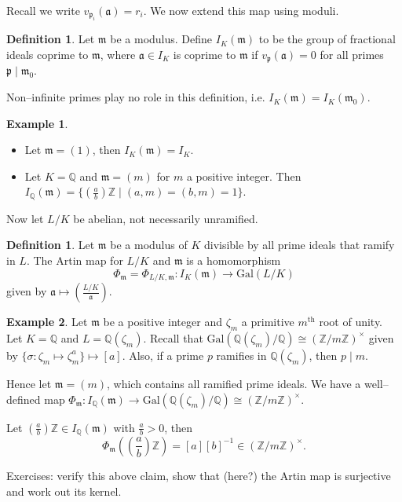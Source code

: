 \documentclass{article}
\theoremstyle{definition}
\newtheorem{example}{Example}[section]
\newtheorem{defn}[theorem]{Definition}
\begin{document}

Recall we write $v_{\mathfrak{p}_i}(\mathfrak{a}) = r_i$. We now extend this map using moduli.

\begin{defn}
    Let $\mathfrak{m}$ be a modulus. Define $I_K(\mathfrak{m})$ to be the group of fractional ideals coprime to $\mathfrak{m}$, where $\mathfrak{a} \in I_K$ is coprime to $\mathfrak{m}$ if $v_{\mathfrak{p}}(\mathfrak{a})=0$ for all primes $\mathfrak{p} \mid \mathfrak{m}_0$.
\end{defn}
Non--infinite primes play no role in this definition, i.e. $I_K(\mathfrak{m}) = I_K(\mathfrak{m}_0)$. 
\begin{example}
    \begin{itemize}
        \item Let $\mathfrak{m} = (1)$, then $I_K(\mathfrak{m}) = I_K$.
        \item Let $K = \mathbb{Q}$ and $\mathfrak{m} = (m)$ for $m$ a positive integer. Then $I_{\mathbb{Q}}(\mathfrak{m}) = \{\left(\frac{a}{b}\right)\mathbb{Z} \mid (a,m)=(b,m)=1\}$.
    \end{itemize}
\end{example}
Now let $L/K$ be abelian, not necessarily unramified.
\begin{defn}
    Let $\mathfrak{m}$ be a modulus of $K$ divisible by all prime ideals that ramify in $L$. The Artin map for $L/K$ and $\mathfrak{m}$ is a homomorphism \[
    \Phi_{\mathfrak{m}} = \Phi_{L/K, \mathfrak{m}} : I_K(\mathfrak{m}) \to \text{Gal}(L/K)
    \]
    given by $\mathfrak{a} \mapsto \left(\frac{L/K}{\mathfrak{a}}\right)$.
\end{defn}
\begin{example}
    Let $\mathfrak{m}$ be a positive integer and $\zeta_m$ a primitive $m^{\text{th}}$ root of unity. Let $K=\mathbb{Q}$ and $L = \mathbb{Q}(\zeta_m)$. Recall that $\text{Gal}(\mathbb{Q}(\zeta_m)/\mathbb{Q}) \cong (\mathbb{Z}/m\mathbb{Z})^\times$ given by $\{\sigma: \zeta_m \mapsto \zeta_m^a\} \mapsto [a]$. Also, if a prime $p$ ramifies in $\mathbb{Q}(\zeta_m)$, then $p \mid m$.
    \vspace{1mm}
     
    Hence let $\mathfrak{m} = (m)$, which contains all ramified prime ideals. We have a well--defined map $\Phi_{\mathfrak{m}} : I_{\mathbb{Q}}(\mathfrak{m}) \to \text{Gal}(\mathbb{Q}(\zeta_m)/\mathbb{Q}) \cong (\mathbb{Z}/m\mathbb{Z})^\times$.
    \vspace{1mm}
     
    Let $\left(\frac{a}{b}\right)\mathbb{Z} \in I_\mathbb{Q}(\mathfrak{m})$ with $\frac{a}{b}>0$, then \[
    \Phi_{\mathfrak{m}} \left( \left(\frac{a}{b}\right)\mathbb{Z}\right) = [a][b]^{-1} \in (\mathbb{Z}/m\mathbb{Z})^\times.
    \]
\end{example}
Exercises: verify this above claim, show that (here?) the Artin map is surjective and work out its kernel.
\end{document}

